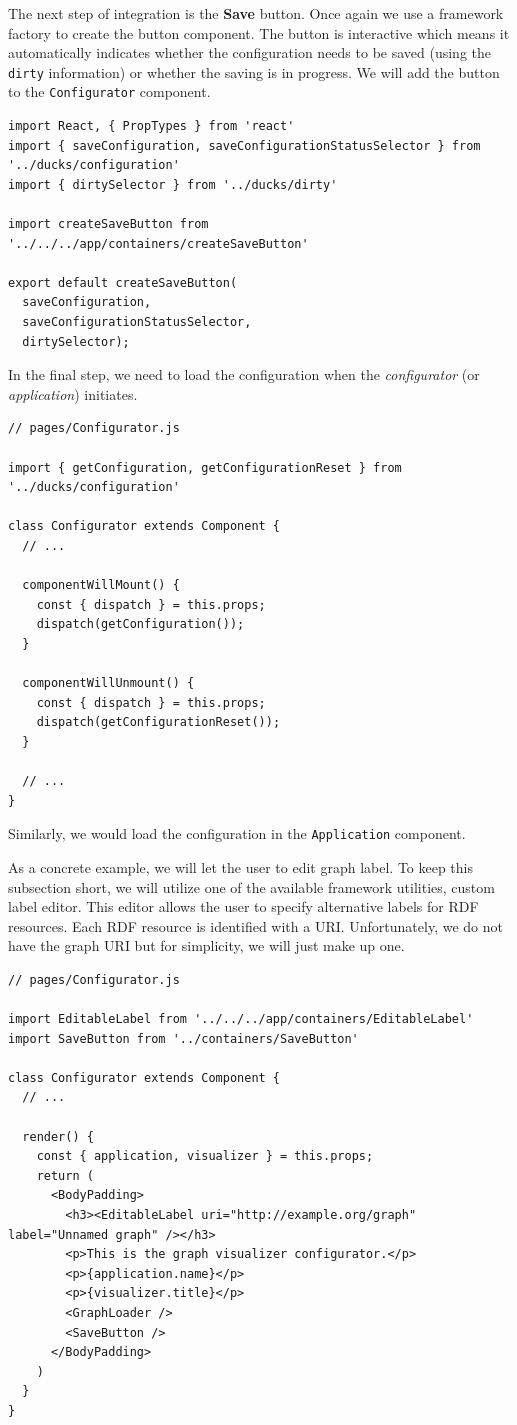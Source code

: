 The next step of integration is the \textbf{Save} button. Once again we use a framework factory to create the button component. The button is interactive which means it automatically indicates whether the configuration needs to be saved (using the \texttt{dirty} information) or whether the saving is in progress. We will add the button to the \texttt{Configurator} component.

\begin{verbatim}
import React, { PropTypes } from 'react'
import { saveConfiguration, saveConfigurationStatusSelector } from '../ducks/configuration'
import { dirtySelector } from '../ducks/dirty'

import createSaveButton from '../../../app/containers/createSaveButton'

export default createSaveButton(
  saveConfiguration,
  saveConfigurationStatusSelector,
  dirtySelector);
\end{verbatim}

In the final step, we need to load the configuration when the \emph{configurator} (or \emph{application}) initiates.

\begin{verbatim}
// pages/Configurator.js

import { getConfiguration, getConfigurationReset } from '../ducks/configuration'

class Configurator extends Component {
  // ...

  componentWillMount() {
    const { dispatch } = this.props;
    dispatch(getConfiguration());
  }

  componentWillUnmount() {
    const { dispatch } = this.props;
    dispatch(getConfigurationReset());
  }
  
  // ...
}
\end{verbatim}

Similarly, we would load the configuration in the \texttt{Application} component.

As a concrete example, we will let the user to edit graph label. To keep this subsection short, we will utilize one of the available framework utilities, custom label editor. This editor allows the user to specify alternative labels for RDF resources. Each RDF resource is identified with a URI. Unfortunately, we do not have the graph URI but for simplicity, we will just make up one.

\begin{verbatim}
// pages/Configurator.js

import EditableLabel from '../../../app/containers/EditableLabel'
import SaveButton from '../containers/SaveButton'

class Configurator extends Component {
  // ...

  render() {
    const { application, visualizer } = this.props;
    return (
      <BodyPadding>
        <h3><EditableLabel uri="http://example.org/graph" label="Unnamed graph" /></h3>
        <p>This is the graph visualizer configurator.</p>
        <p>{application.name}</p>
        <p>{visualizer.title}</p>
        <GraphLoader />
        <SaveButton />
      </BodyPadding>
    )
  }
}
\end{verbatim}

